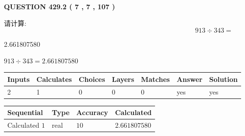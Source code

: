 \documentclass{ctexart}
\begin{document}
   
  
\vspace{0.2in}
  
{\textbf{\Large{QUESTION
429.2 
 ( 7 , 7 , 107 )
}}}
  
  
 
请计算:
\begin{equation}
913  \div    %
343 = \nonumber
\end{equation}
 
 
 
\noindent{}
 
 

2.661807580
 
 
\noindent{}
 
 

 
 
 
\noindent{}
 
 

$ %
913 \div  %
343=   %
2.661807580$
 
 
\noindent{}
 
 

 
   
   
   
   
\noindent\begin{tabular}{|l|l|l|l|l|l|l|}
 \hline
Inputs & Calculates & Choices & Layers & Matches & Answer & Solution \\ \hline
 2  & 
 1  & 
 0
  & 
 0  & 
 0  & 
  yes & 
  yes 
  \\ \hline
 \end{tabular}
   
   
   
   
\noindent{}
   
   
  
  
\noindent\begin{tabular}{|l|l|l|l|}
\hline
 Sequential & Type & Accuracy & Calculated \\ 
\hline
 
 
  Calculated $  1 $ & real & $  10  $ & 
 $ 2.661807580 $ 
 \\  \hline  
 \end{tabular}
   
\end{document}
